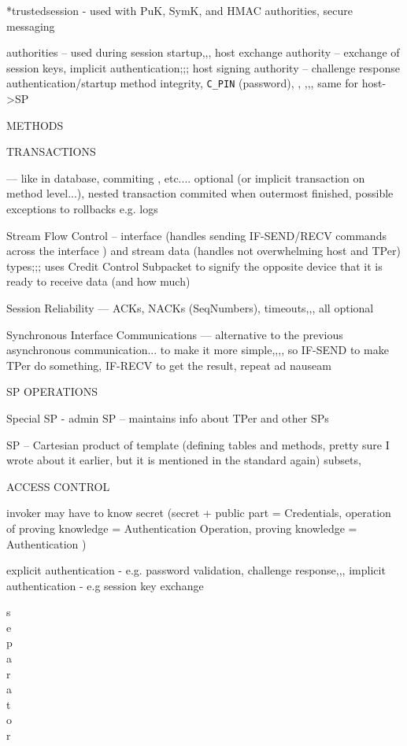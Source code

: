*trustedsession - used with PuK, SymK, and HMAC authorities, secure messaging

authorities -- used during session startup,,, host exchange authority -- exchange of session keys, implicit authentication;;; host signing authority -- challenge response authentication/startup method integrity, \verb|C_PIN| (password), , ,,, same for host->SP

METHODS

TRANSACTIONS 


--- like in database, commiting , etc.... optional (or implicit transaction on method level...), nested transaction commited when outermost finished, possible exceptions to rollbacks e.g. logs

Stream Flow Control -- interface (handles  sending IF-SEND/RECV commands across the interface ) and stream data (handles not overwhelming host and TPer) types;;; uses Credit Control Subpacket to signify the opposite device that it is ready to receive data (and how much)

Session Reliability --- ACKs, NACKs (SeqNumbers), timeouts,,, all optional

Synchronous Interface Communications --- alternative to the previous asynchronous communication... to make it more simple,,,, so IF-SEND to make TPer do something, IF-RECV to get the result, repeat ad nauseam


SP OPERATIONS

Special SP - admin SP -- maintains info about TPer and other SPs

SP -- Cartesian product of template (defining tables and methods, pretty sure I wrote about it earlier, but it is mentioned in the standard again) subsets, 

ACCESS CONTROL

invoker may have to know secret (secret + public part = Credentials, operation of proving knowledge = Authentication Operation, proving knowledge = Authentication )

explicit authentication - e.g. password validation, challenge response,,,
implicit authentication - e.g session key exchange




s \\
e \\
p \\
a \\
r \\
a \\
t \\
o \\
r \\

